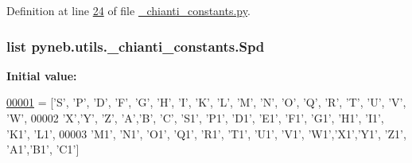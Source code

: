 Definition at line \hyperlink{__chianti__constants_8py_source_l00024}{24} of file \hyperlink{__chianti__constants_8py_source}{\-\_\-chianti\-\_\-constants.\-py}.

\hypertarget{namespacepyneb_1_1utils_1_1__chianti__constants_a747bb75e4249625a2aefd7060478096f}{
\subsubsection[{Spd}]{\setlength{\rightskip}{0pt plus 5cm}list pyneb.\-utils.\-\_\-chianti\-\_\-constants.\-Spd}}\label{namespacepyneb_1_1utils_1_1__chianti__constants_a747bb75e4249625a2aefd7060478096f}
{\bfseries Initial value\-:}
\begin{DoxyCode}
\hypertarget{namespacepyneb_1_1utils_1_1__chianti__constants_l00001}{}\hyperlink{namespacepyneb_1_1utils_1_1__chianti__constants}{00001} = [\textcolor{stringliteral}{'S'}, \textcolor{stringliteral}{'P'}, \textcolor{stringliteral}{'D'}, \textcolor{stringliteral}{'F'}, \textcolor{stringliteral}{'G'}, \textcolor{stringliteral}{'H'}, \textcolor{stringliteral}{'I'}, \textcolor{stringliteral}{'K'}, \textcolor{stringliteral}{'L'}, \textcolor{stringliteral}{'M'}, \textcolor{stringliteral}{'N'}, \textcolor{stringliteral}{'O'}, \textcolor{stringliteral}{'Q'}, \textcolor{stringliteral}{'}\textcolor{stringliteral}{R', '}T', '\textcolor{stringliteral}{U', '}V', 'W',
00002        \textcolor{stringliteral}{'X'},\textcolor{stringliteral}{'Y'}, \textcolor{stringliteral}{'Z'}, \textcolor{stringliteral}{'A'},\textcolor{stringliteral}{'B'}, \textcolor{stringliteral}{'C'}, \textcolor{stringliteral}{'S1'}, \textcolor{stringliteral}{'P1'}, \textcolor{stringliteral}{'D1'}, \textcolor{stringliteral}{'E1'}, \textcolor{stringliteral}{'F1'}, \textcolor{stringliteral}{'G1'}, \textcolor{stringliteral}{'H1'}, \textcolor{stringliteral}{'I1'}, \textcolor{stringliteral}{'K1'}, \textcolor{stringliteral}{'L1'}, 
00003        \textcolor{stringliteral}{'M1'}, \textcolor{stringliteral}{'N1'}, \textcolor{stringliteral}{'O1'}, \textcolor{stringliteral}{'Q1'}, \textcolor{stringliteral}{'R1'}, \textcolor{stringliteral}{'T1'}, \textcolor{stringliteral}{'U1'}, \textcolor{stringliteral}{'V1'}, \textcolor{stringliteral}{'W1'},\textcolor{stringliteral}{'X1'},\textcolor{stringliteral}{'Y1'}, \textcolor{stringliteral}{'Z1'}, \textcolor{stringliteral}{'A1'},\textcolor{stringliteral}{'B1'}, \textcolor{stringliteral}{'C1'}]
\end{DoxyCode}



